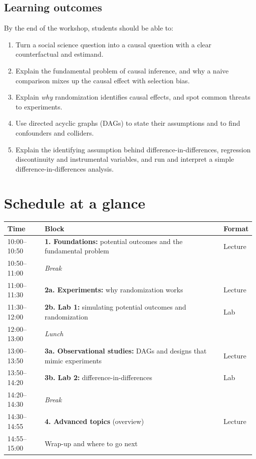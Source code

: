 \documentclass[11pt,a4paper]{article}
\begin{document}
\subsection{Learning outcomes}
By the end of the workshop, students should be able to:
\begin{enumerate}[leftmargin=1.6em]
  \item Turn a social science question into a causal question with a clear counterfactual and estimand.
  \item Explain the fundamental problem of causal inference, and why a naive comparison mixes up the causal effect with selection bias.
  \item Explain \emph{why} randomization identifies causal effects, and spot common threats to experiments.
  \item Use directed acyclic graphs (DAGs) to state their assumptions and to find confounders and colliders.
  \item Explain the identifying assumption behind difference-in-differences, regression discontinuity and instrumental variables, and run and interpret a simple difference-in-differences analysis.
\end{enumerate}

\clearpage
\section{Schedule at a glance}

\noindent
\renewcommand{\arraystretch}{1.25}
\begin{tabularx}{\textwidth}{@{}l X l@{}}
  \toprule
  \textbf{Time} & \textbf{Block} & \textbf{Format} \\
  \midrule
  10:00--10:50 & \textbf{1. Foundations:} potential outcomes and the fundamental problem & Lecture \\
  10:50--11:00 & \emph{Break} & \\
  11:00--11:30 & \textbf{2a. Experiments:} why randomization works & Lecture \\
  11:30--12:00 & \textbf{2b. Lab 1:} simulating potential outcomes and randomization & Lab \\
  \midrule
  12:00--13:00 & \emph{Lunch} & \\
  \midrule
  13:00--13:50 & \textbf{3a. Observational studies:} DAGs and designs that mimic experiments & Lecture \\
  13:50--14:20 & \textbf{3b. Lab 2:} difference-in-differences & Lab \\
  14:20--14:30 & \emph{Break} & \\
  14:30--14:55 & \textbf{4. Advanced topics} (overview) & Lecture \\
  14:55--15:00 & Wrap-up and where to go next & \\
  \bottomrule
\end{tabularx}
\end{document}
